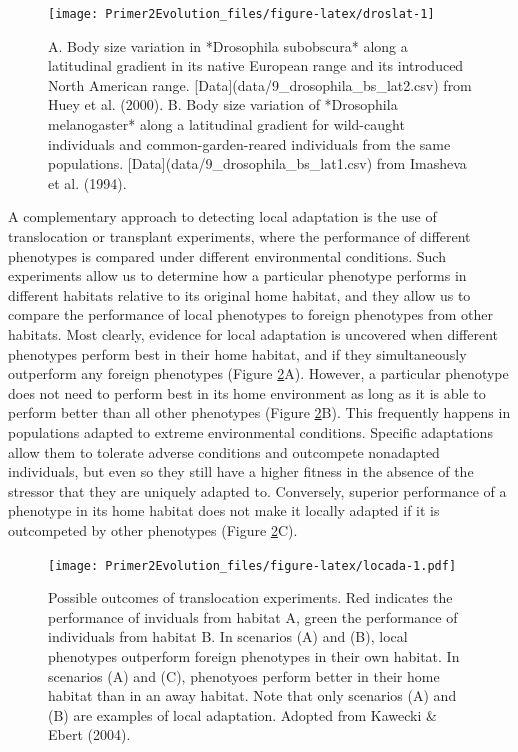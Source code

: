 \documentclass[
]{book}
\begin{document}
\begin{figure}
\texttt{[image: Primer2Evolution\_files/figure-latex/droslat-1]} \caption{A. Body size variation in *Drosophila subobscura* along a latitudinal gradient in its native European range and its introduced North American range. [Data](data/9_drosophila_bs_lat2.csv) from Huey et al. (2000). B. Body size variation of *Drosophila melanogaster* along a latitudinal gradient for wild-caught individuals and common-garden-reared individuals from the same populations. [Data](data/9_drosophila_bs_lat1.csv) from Imasheva et al. (1994).}\label{fig:droslat}
\end{figure}

A complementary approach to detecting local adaptation is the use of translocation or transplant experiments, where the performance of different phenotypes is compared under different environmental conditions. Such experiments allow us to determine how a particular phenotype performs in different habitats relative to its original home habitat, and they allow us to compare the performance of local phenotypes to foreign phenotypes from other habitats. Most clearly, evidence for local adaptation is uncovered when different phenotypes perform best in their home habitat, and if they simultaneously outperform any foreign phenotypes (Figure \ref{fig:locada}A). However, a particular phenotype does not need to perform best in its home environment as long as it is able to perform better than all other phenotypes (Figure \ref{fig:locada}B). This frequently happens in populations adapted to extreme environmental conditions. Specific adaptations allow them to tolerate adverse conditions and outcompete nonadapted individuals, but even so they still have a higher fitness in the absence of the stressor that they are uniquely adapted to. Conversely, superior performance of a phenotype in its home habitat does not make it locally adapted if it is outcompeted by other phenotypes (Figure \ref{fig:locada}C).

\begin{figure}
\centering
\texttt{[image: Primer2Evolution\_files/figure-latex/locada-1.pdf]}
\caption{\label{fig:locada}Possible outcomes of translocation experiments. Red indicates the performance of inviduals from habitat A, green the performance of individuals from habitat B. In scenarios (A) and (B), local phenotypes outperform foreign phenotypes in their own habitat. In scenarios (A) and (C), phenotyoes perform better in their home habitat than in an away habitat. Note that only scenarios (A) and (B) are examples of local adaptation. Adopted from Kawecki \& Ebert (2004).}
\end{figure}
\end{document}
